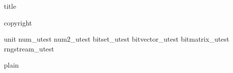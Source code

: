 \documentclass[12pt]{article}
\begin{document}
 {title}

 {copyright}
\tableofcontents
\clearpage


 {unit}
 {num_utest}
 {num2_utest}
 {bitset_utest}
 {bitvector_utest}
 {bitmatrix_utest}
 {rngstream_utest}


 {plain}

\end{document}
